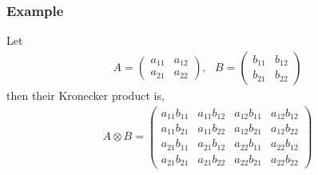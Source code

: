 \subsubsection*{Example}
Let 
\begin{align*}
A = 
\left(\begin{array}{cc}
a_{11} & a_{12}
\\
a_{21} & a_{22}
\end{array}\right),~~~
B = 
\left(\begin{array}{cc}
b_{11} & b_{12}
\\
b_{21} & b_{22}
\end{array}\right)
\end{align*}
then their Kronecker product is,
\begin{align}
A \otimes B = 
\left(\begin{array}{cccc}
a_{11}b_{11} & a_{11}b_{12} & a_{12}b_{11} & a_{12}b_{12}
\\
a_{11}b_{21} & a_{11}b_{22} & a_{12}b_{21} & a_{12}b_{22}
\\
a_{21}b_{11} & a_{21}b_{12} & a_{22}b_{11} & a_{22}b_{12}
\\
a_{21}b_{21} & a_{21}b_{22} & a_{22}b_{21} & a_{22}b_{22}
\end{array}\right)
\end{align}


